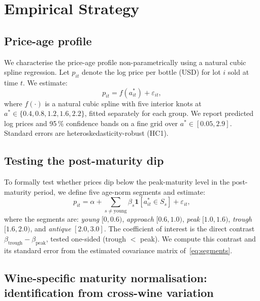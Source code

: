 
\section{Empirical Strategy}
\label{sec:empirics}

\subsection{Price-age profile}

We characterise the price-age profile non-parametrically using a natural cubic spline
regression. Let $p_{it}$ denote the log price per bottle (USD) for lot $i$ sold at time $t$.
We estimate:
\begin{equation}
  p_{it} = f(a_{it}^*) + \varepsilon_{it},
  \label{eq:spline}
\end{equation}
where $f(\cdot)$ is a natural cubic spline with five interior knots at $a^* \in
\{0.4, 0.8, 1.2, 1.6, 2.2\}$, fitted separately for each group. We report predicted
log prices and 95\,\% confidence bands on a fine grid over $a^* \in [0.05, 2.9]$.
Standard errors are heteroskedasticity-robust (HC1).

\subsection{Testing the post-maturity dip}

To formally test whether prices dip below the peak-maturity level in the post-maturity period,
we define five age-norm segments and estimate:
\begin{equation}
  p_{it} = \alpha + \sum_{s \neq \text{young}} \beta_s \mathbf{1}[a_{it}^* \in S_s] + \varepsilon_{it},
  \label{eq:segments}
\end{equation}
where the segments are: \textit{young} $[0, 0.6)$, \textit{approach} $[0.6, 1.0)$,
\textit{peak} $[1.0, 1.6)$, \textit{trough} $[1.6, 2.0)$, and \textit{antique} $[2.0, 3.0]$.
The coefficient of interest is the direct contrast $\beta_{\text{trough}} - \beta_{\text{peak}}$,
tested one-sided (trough $<$ peak). We compute this contrast and its standard error from the
estimated covariance matrix of~\eqref{eq:segments}.

\subsection{Wine-specific maturity normalisation: identification from cross-wine variation}
\label{sec:empirics:normalisation}

